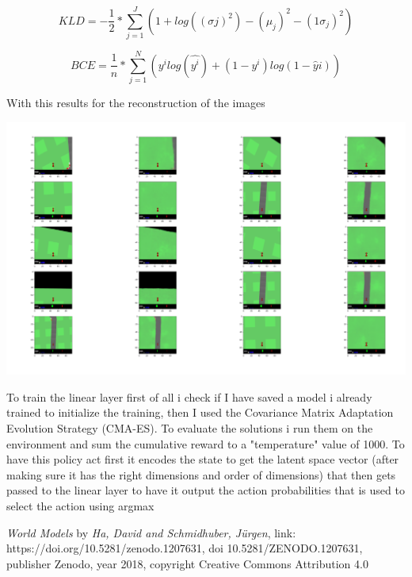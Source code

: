 \documentclass[10pt,a4paper]{article}
\begin{document}
\begin{equation*}
    KLD = -\frac{1}{2} * \sum_{j = 1}^{J} (1 + log((\sigma j )^2) - (\mu_j )^2 - (1\sigma_j )^2) 
\end{equation*}

\begin{equation*}
    BCE = \frac{1}{n} * \sum_{j = 1}^{N} (y^i log(\hat{y^i}) + (1 - y^i) log(1 - \hat{y}i))
\end{equation*}

With this results for the reconstruction of the images

\includegraphics[scale=0.14]{VAEres.png}

To train the linear layer first of all i check if I have saved a model i already trained to initialize the training, then I used the Covariance Matrix Adaptation Evolution Strategy (CMA-ES). 
To evaluate the solutions i run them on the environment and sum the cumulative reward to a "temperature" value of 1000.
To have this policy act first it encodes the state to get the latent space vector (after making sure it has the right dimensions and order of dimensions) that then gets passed to the linear layer to have it output the action probabilities that is used to select the action using argmax






\newpage

\begin{thebibliography}{9}

    \emph{World Models} by \textit{Ha, David and Schmidhuber, Jürgen},  link: https://doi.org/10.5281/zenodo.1207631, doi 10.5281/ZENODO.1207631, publisher Zenodo, year 2018, copyright Creative Commons Attribution 4.0
    
\end{thebibliography}
\end{document}
